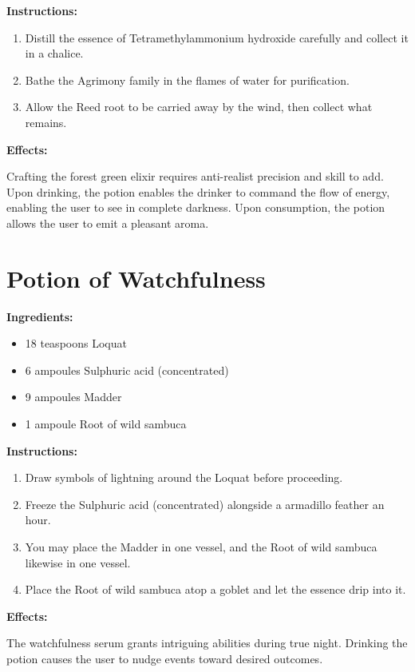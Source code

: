\documentclass{article}
\begin{document}
\textbf{Instructions:}

\begin{enumerate}
  \item Distill the essence of Tetramethylammonium hydroxide carefully and collect it in a chalice.
  \item Bathe the Agrimony family in the flames of water for purification.
  \item Allow the Reed root to be carried away by the wind, then collect what remains.
\end{enumerate}

\textbf{Effects:}

Crafting the forest green elixir requires anti-realist precision and skill to add. Upon drinking, the potion enables the drinker to command the flow of energy, enabling the user to see in complete darkness. Upon consumption, the potion allows the user to emit a pleasant aroma.

\newpage
\section*{Potion of Watchfulness}

\textbf{Ingredients:}

\begin{itemize}
  \item 18 teaspoons Loquat
  \item 6 ampoules Sulphuric acid (concentrated)
  \item 9 ampoules Madder
  \item 1 ampoule Root of wild sambuca
\end{itemize}

\textbf{Instructions:}

\begin{enumerate}
  \item Draw symbols of lightning around the Loquat before proceeding.
  \item Freeze the Sulphuric acid (concentrated) alongside a armadillo feather an hour.
  \item You may place the Madder in one vessel, and the Root of wild sambuca likewise in one vessel.
  \item Place the Root of wild sambuca atop a goblet and let the essence drip into it.
\end{enumerate}

\textbf{Effects:}

The watchfulness serum grants intriguing abilities during true night. Drinking the potion causes the user to nudge events toward desired outcomes.
\end{document}
